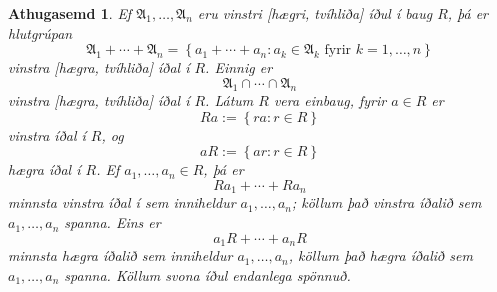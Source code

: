 \documentclass[a4paper,icelandic,11pt]{book}
\theoremstyle{plain}
\newtheorem*{ath}{Athugasemd}
\begin{document}
\begin{ath}
  Ef $\mathfrak A_1,\dots,\mathfrak A_n$ eru vinstri [hægri, tvíhliða] íðul í
  baug $R$, þá er hlutgrúpan\[
  \mathfrak A_1 + \cdots + \mathfrak A_n
  = \left\{ a_1 + \cdots + a_n : a_k\in\mathfrak A_k 
  \text{ fyrir } k = 1,\dots,n \right\}
  \]
  vinstra [hægra, tvíhliða] íðal í $R$. Einnig er\[
  \mathfrak A_1 \cap \cdots \cap \mathfrak A_n
  \]
  vinstra [hægra, tvíhliða] íðal í $R$. Látum $R$ vera \emph{einbaug}, fyrir
  $a\in R$ er\[
  Ra := \left\{ ra : r\in R \right\}
  \]
  vinstra íðal í $R$, og\[
  aR := \left\{ ar : r\in R \right\}
  \]
  hægra íðal í $R$. Ef $a_1,\dots,a_n\in R$, þá er\[
  Ra_1 + \cdots + Ra_n
  \]
  minnsta vinstra íðal í sem inniheldur $a_1,\dots,a_n$; köllum það
  \emph{vinstra íðalið sem $a_1,\dots,a_n$ spanna}. Eins er\[
  a_1 R + \cdots + a_n R
  \]
  minnsta hægra íðalið sem inniheldur $a_1,\dots,a_n$, köllum það
  \emph{hægra íðalið sem $a_1,\dots,a_n$ spanna}.
  Köllum svona íðul \emph{endanlega spönnuð}.
\end{ath}
\end{document}
